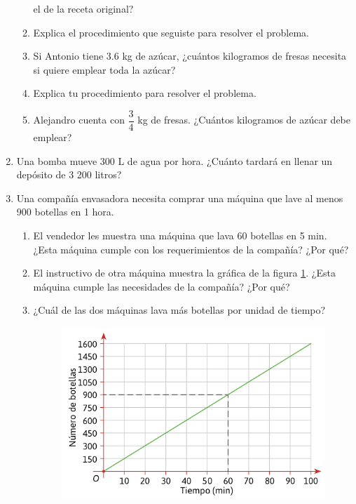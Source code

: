 \documentclass[11pt]{book}
\begin{document}
\begin{enumerate}
\begin{enumerate}
                el de la receta original?
          \item Explica el procedimiento que seguiste para resolver el problema.
          \item Si Antonio tiene 3.6 kg de azúcar, ¿cuántos kilogramos de fresas necesita si quiere emplear toda la azúcar?
          \item Explica tu procedimiento para resolver el problema.
          \item Alejandro cuenta con $\dfrac{3}{4}$ kg de fresas. ¿Cuántos kilogramos de azúcar debe emplear?
        \end{enumerate}
  \item Una bomba mueve 300 L de agua por hora. ¿Cuánto tardará en llenar un depósito de 3 200 litros?
  \item Una compañía envasadora necesita comprar una máquina que lave al menos 900
        botellas en 1 hora.
        \begin{enumerate}
          \item El vendedor les muestra una máquina que lava 60 botellas en 5 min. ¿Esta máquina cumple con los requerimientos de la compañía? ¿Por qué?
          \item El instructivo de otra máquina muestra la gráfica de
                la figura \ref{fig:tabla_instructivo}. ¿Esta máquina cumple las necesidades de la compañía? ¿Por qué?

          \item ¿Cuál de las dos máquinas lava más botellas por unidad de tiempo?
                \begin{figure}[H]
                  \centering
                  \includegraphics[width=0.5\linewidth]{tabla_instructivo.png}
                  \label{fig:tabla_instructivo}
                \end{figure}

        \end{enumerate}
\end{enumerate}
\end{document}
